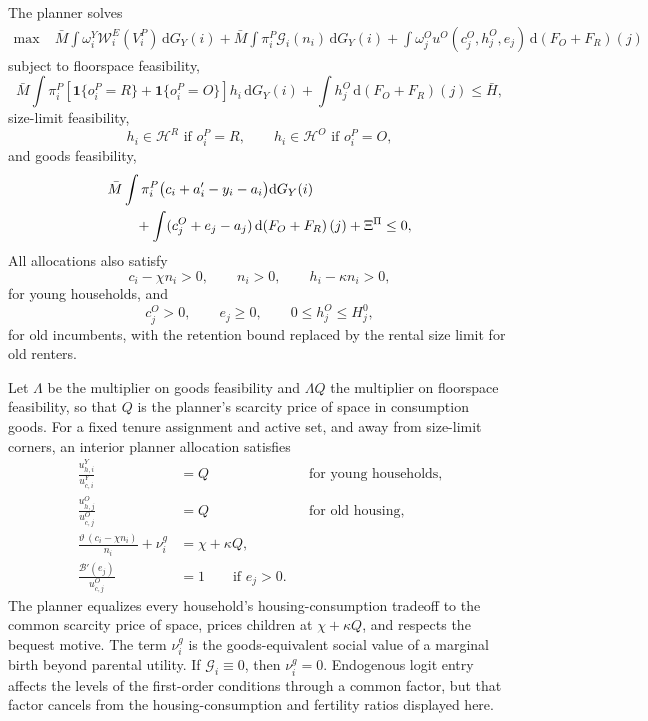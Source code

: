 \documentclass[11pt]{article}
\newcommand{\dd}{\mathrm d}
\newcommand{\1}{\mathbf 1}
\newcommand{\HH}{\mathcal H}
\begin{document}
The planner solves
\begin{align}
\max\; &
\bar M\int
\omega_i^Y\mathcal W_i^E(V_i^P)\,\dd G_Y(i)
+
\bar M\int
\pi_i^P\mathcal G_i(n_i)\,\dd G_Y(i)
+
\int
\omega_j^O u^O(c_j^O,h_j^O,e_j)\,\dd\!\left(F_O+F_R\right)(j)
\label{eq:compact_planner_problem}
\end{align}
subject to floorspace feasibility,
\[
\bar M\int \pi_i^P
\left[\1\{o_i^P=R\}+\1\{o_i^P=O\}\right]h_i\,\dd G_Y(i)
+\int h_j^O\,\dd\!\left(F_O+F_R\right)(j)\le \bar H,
\]
size-limit feasibility,
\[
h_i\in\HH^R\text{ if }o_i^P=R,
\qquad
h_i\in\HH^O\text{ if }o_i^P=O,
\]
and goods feasibility,
\begin{align*}
&\bar M\int
\pi_i^P
\big(c_i+a_i'-y_i-a_i\big)\dd G_Y(i)
\notag\\
&\qquad
+
\int(c_j^O+e_j-a_j)\,\dd\!\left(F_O+F_R\right)(j)
+\Xi^\Pi
\le0,
\end{align*}
All allocations also satisfy
\[
c_i-\chi n_i>0,\qquad n_i>0,\qquad h_i-\kappa n_i>0,
\]
for young households, and
\[
c_j^O>0,\qquad e_j\ge0,\qquad 0\le h_j^O\le H_j^0,
\]
for old incumbents, with the retention bound replaced by the rental size limit for old renters.

Let $\Lambda$ be the multiplier on goods feasibility and $\Lambda Q$ the multiplier on floorspace feasibility, so that $Q$ is the planner's scarcity price of space in consumption goods. For a fixed tenure assignment and active set, and away from size-limit corners, an interior planner allocation satisfies
\begin{align*}
\frac{u^Y_{h,i}}{u^Y_{c,i}}&=Q
&&\text{for young households},
\\
\frac{u^O_{h,j}}{u^O_{c,j}}&=Q
&&\text{for old housing},
\\
\frac{\vartheta\,(c_i-\chi n_i)}{n_i}+\nu_i^g&=\chi+\kappa Q,
\\
\frac{\mathcal B'(e_j)}{u^O_{c,j}}&=1
\qquad \text{if }e_j>0.
\end{align*}
The planner equalizes every household's housing-consumption tradeoff to the common scarcity price of space, prices children at $\chi+\kappa Q$, and respects the bequest motive.
The term $\nu_i^g$ is the goods-equivalent social value of a marginal birth beyond parental utility. If $\mathcal G_i\equiv0$, then $\nu_i^g=0$.
Endogenous logit entry affects the levels of the first-order conditions through a common factor, but that factor cancels from the housing-consumption and fertility ratios displayed here.
\end{document}
